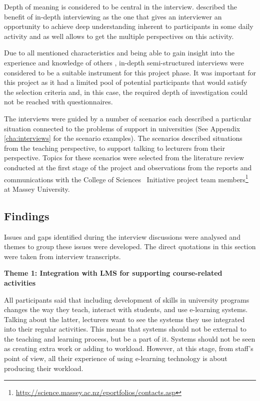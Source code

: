 Depth of meaning is considered to be central in the interview.
\citet{Johnson2001} described the benefit of in-depth interviewing as the one
that gives an interviewer an opportunity to achieve deep understanding inherent
to participants in some daily activity and as well allows to get the multiple
perspectives on this activity.

Due to all mentioned characteristics and being able to gain insight into the
experience and knowledge of others \citep{Schostak2006}, in-depth
semi-structured interviews were considered to be a suitable instrument for this
project phase. It was important for this project as it had a limited pool of 
potential participants that would satisfy the selection criteria and, in this
case, the required depth of investigation could not be reached with
questionnaires.

The interviews were guided by a number of scenarios each described a particular
situation connected to the problems of \LLLs support in universities (See
Appendix \ref{cha:interviews} for the scenario examples). The scenarios
described situations from the teaching perspective, to support talking to
lecturers from their perspective. Topics for these scenarios were selected from
the literature review conducted at the first stage of the project and
observations from the reports and communications with the College of Sciences
\ep~Initiative project team
members\footnote{\url{http://science.massey.ac.nz/eportfolios/contacts.asp}} at
Massey University.

\subsection{Findings}

Issues and gaps identified during the interview discussions were analysed and
themes to group these issues were developed. The direct quotations in this
section were taken from interview transcripts.

\textbf{Theme 1: Integration with LMS for supporting course-related activities}

All participants said that including development of \LLLs skills in university
programs changes the way they teach, interact with students, and use e-learning
systems. Talking about the latter, lecturers want to see the systems they use
integrated into their regular activities. This means that systems should not be
external to the teaching and learning process, but be a part of it. Systems
should not be seen as creating extra work or adding to workload. However, at
this stage, from staff's point of view, all their experience of using e-learning
technology is about producing their workload.

